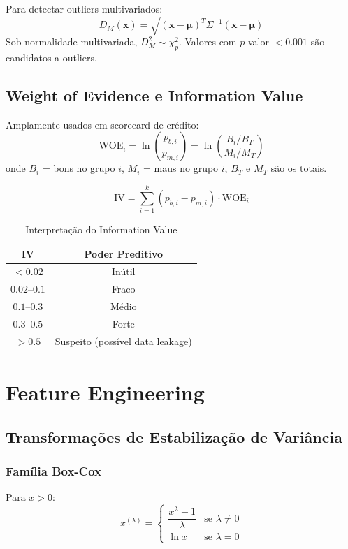 \documentclass[12pt,a4paper,twoside]{book}
\theoremstyle{definition}
\theoremstyle{remark}
\newcommand{\bx}{\bm{x}}
\begin{document}
Para detectar outliers multivariados:
\[
D_M(\bx) = \sqrt{(\bx - \bm{\mu})^T \Sigma^{-1} (\bx - \bm{\mu})}
\]
Sob normalidade multivariada, $D_M^2 \sim \chi^2_p$. Valores com $p$-valor $< 0.001$ são candidatos a outliers.

\section{Weight of Evidence e Information Value}

Amplamente usados em scorecard de crédito:
\[
\mathrm{WOE}_i = \ln\!\left(\frac{p_{b,i}}{p_{m,i}}\right) = \ln\!\left(\frac{B_i/B_T}{M_i/M_T}\right)
\]
onde $B_i$ = bons no grupo $i$, $M_i$ = maus no grupo $i$, $B_T$ e $M_T$ são os totais.

\[
\mathrm{IV} = \sum_{i=1}^{k} (p_{b,i} - p_{m,i}) \cdot \mathrm{WOE}_i
\]

\begin{table}[H]
\centering
\caption{Interpretação do Information Value}
\begin{tabular}{cc}
\toprule
\textbf{IV} & \textbf{Poder Preditivo} \\
\midrule
$< 0.02$ & Inútil \\
$0.02$--$0.1$ & Fraco \\
$0.1$--$0.3$ & Médio \\
$0.3$--$0.5$ & Forte \\
$> 0.5$ & Suspeito (possível data leakage) \\
\bottomrule
\end{tabular}
\end{table}

\chapter{Feature Engineering}

\section{Transformações de Estabilização de Variância}

\subsection{Família Box-Cox}

Para $x > 0$:
\[
x^{(\lambda)} = \begin{cases}
\dfrac{x^\lambda - 1}{\lambda} & \text{se } \lambda \neq 0 \\[6pt]
\ln x & \text{se } \lambda = 0
\end{cases}
\]
\end{document}
